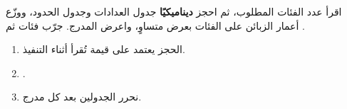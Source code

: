 \begin{statement}
اقرأ عدد الفئات المطلوب، ثم احجز \textbf{ديناميكيًا} جدول العدادات وجدول الحدود، ووزّع أعمار الزبائن على الفئات بعرض متساوٍ، واعرض المدرج. جرّب  فئات ثم .
\end{statement}
\begin{stepsbox}\begin{enumerate}
\item الحجز يعتمد على قيمة تُقرأ أثناء التنفيذ.
\item \par{\centering\small{}\par}.
\item نحرر الجدولين بعد كل مدرج.
\end{enumerate}\end{stepsbox}
